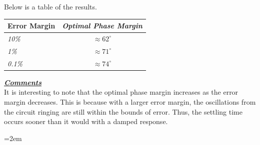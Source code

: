 \documentclass[12pt, fleqn]{article}
\begin{document}
\begin{enumerate}[label=(\alph*)]
{        Below is a table of the results.\\[0.25cm]
        \begin{table}[H]
            \centering
            \setlength{\tabcolsep}{20pt}
            \renewcommand{\arraystretch}{1.5}
            \begin{tabular}{|l|c|}
                \hline
                \textbf{Error Margin}  &  \textit{Optimal Phase Margin}\\
                \hline
                \textit{10\%} & $\approx 62^\circ$\\
                \hline
                \textit{1\%} & $\approx 71^\circ$\\
                \hline
                \textit{0.1\%} & $\approx 74^\circ$\\
                \hline
            \end{tabular}
        \end{table}
        \underline{\textbf{\textit{Comments}}}\\[0.25cm]
        It is interesting to note that the optimal phase margin increases as the error margin decreases.  This is because with a larger error margin, the oscillations from the circuit ringing are still within the bounds of error.  Thus, the settling time occurs sooner than it would with a damped response.
        }
    \end{enumerate}
\newpage
\appendix

\newpage
{}
\emergencystretch=2em
\nocite{*}
\printbibliography
\end{document}
